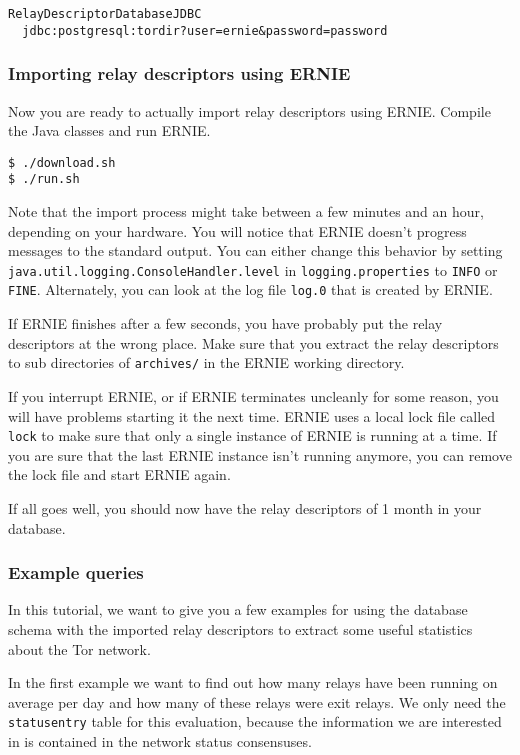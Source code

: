 \documentclass{article}
\begin{document}
\begin{verbatim}
RelayDescriptorDatabaseJDBC
  jdbc:postgresql:tordir?user=ernie&password=password
\end{verbatim}

\subsubsection{Importing relay descriptors using ERNIE}

Now you are ready to actually import relay descriptors using ERNIE.
Compile the Java classes and run ERNIE.

\begin{verbatim}
$ ./download.sh
$ ./run.sh
\end{verbatim}

Note that the import process might take between a few minutes and an hour,
depending on your hardware.
You will notice that ERNIE doesn't progress messages to the standard
output.
You can either change this behavior by setting
\verb+java.util.logging.ConsoleHandler.level+ in
\verb+logging.properties+ to \verb+INFO+ or \verb+FINE+.
Alternately, you can look at the log file \verb+log.0+ that is created by
ERNIE.

If ERNIE finishes after a few seconds, you have probably put the relay
descriptors at the wrong place.
Make sure that you extract the relay descriptors to sub directories of
\verb+archives/+ in the ERNIE working directory.

If you interrupt ERNIE, or if ERNIE terminates uncleanly for some reason,
you will have problems starting it the next time.
ERNIE uses a local lock file called \verb+lock+ to make sure that only a
single instance of ERNIE is running at a time.
If you are sure that the last ERNIE instance isn't running anymore, you
can remove the lock file and start ERNIE again.

If all goes well, you should now have the relay descriptors of 1 month in
your database.

\subsubsection{Example queries}

In this tutorial, we want to give you a few examples for using the
database schema with the imported relay descriptors to extract some useful
statistics about the Tor network.

In the first example we want to find out how many relays have been running
on average per day and how many of these relays were exit relays.
We only need the \verb+statusentry+ table for this evaluation, because
the information we are interested in is contained in the network status
consensuses.
\end{document}

